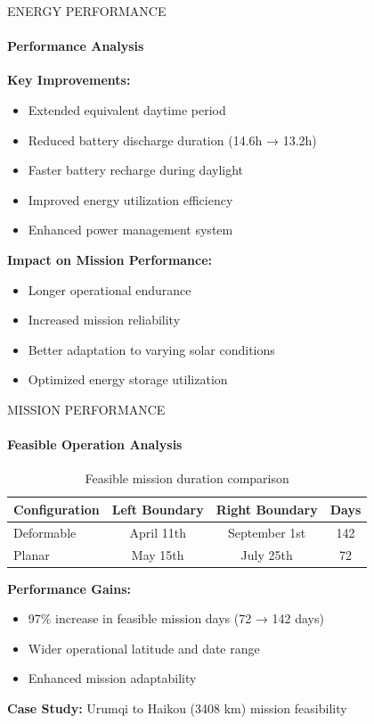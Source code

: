 \documentclass{beamer}
\begin{document}
\begin{frame}{ENERGY PERFORMANCE}
    \framesubtitle{Performance Analysis}
    
    \textbf{Key Improvements:}
    \begin{itemize}
        \item Extended equivalent daytime period
        \item Reduced battery discharge duration (14.6h → 13.2h)
        \item Faster battery recharge during daylight
        \item Improved energy utilization efficiency
        \item Enhanced power management system
    \end{itemize}
    
    \vspace{0.5cm}
    \textbf{Impact on Mission Performance:}
    \begin{itemize}
        \item Longer operational endurance
        \item Increased mission reliability
        \item Better adaptation to varying solar conditions
        \item Optimized energy storage utilization
    \end{itemize}
\end{frame}

\begin{frame}{MISSION PERFORMANCE}
    \framesubtitle{Feasible Operation Analysis}
    
    \begin{table}
        \centering
        \begin{tabular}{|l|c|c|c|}
            \hline
            \textbf{Configuration} & \textbf{Left Boundary} & \textbf{Right Boundary} & \textbf{Days} \\
            \hline
            Deformable & April 11th & September 1st & 142 \\
            Planar & May 15th & July 25th & 72 \\
            \hline
        \end{tabular}
        \caption{Feasible mission duration comparison}
    \end{table}
    
    \textbf{Performance Gains:}
    \begin{itemize}
        \item 97\% increase in feasible mission days (72 → 142 days)
        \item Wider operational latitude and date range
        \item Enhanced mission adaptability
    \end{itemize}
    
    \textbf{Case Study:} Urumqi to Haikou (3408 km) mission feasibility
\end{frame}
\end{document}

